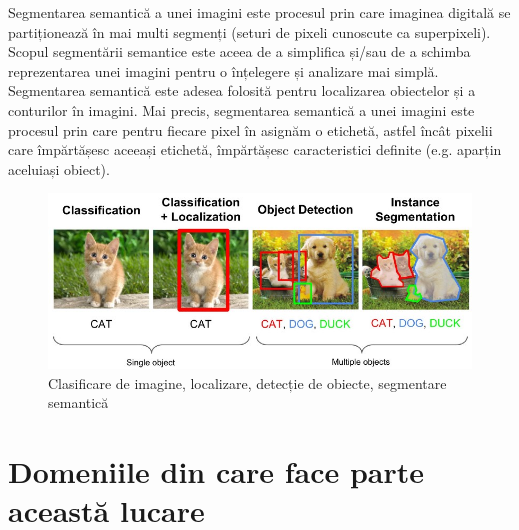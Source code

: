Segmentarea semantică a unei imagini este procesul prin care imaginea digitală se partiționează în mai multi segmenți (seturi de pixeli cunoscute ca superpixeli). Scopul segmentării semantice este aceea de a simplifica și/sau de a schimba reprezentarea unei imagini pentru o înțelegere și analizare mai simplă. Segmentarea semantică este adesea folosită pentru localizarea obiectelor și a conturilor în imagini. Mai precis, segmentarea semantică a unei imagini este procesul prin care pentru fiecare pixel în asignăm o etichetă, astfel încât pixelii care împărtășesc aceeași etichetă, împărtășesc caracteristici definite (e.g. aparțin aceluiași obiect).
\begin{figure}[h!]
    	\centering
	\captionsetup{justification=centering, margin=2cm}
	\includegraphics[width=1.0\textwidth]{figures/class_detect_segment.jpeg}
	\caption{Clasificare de imagine, localizare, detecție de obiecte, segmentare semantică \cite{class_detect_segment}}
	\label{fig:class_detect_semgent}
\end{figure}
\section{Domeniile din care face parte această lucare}
